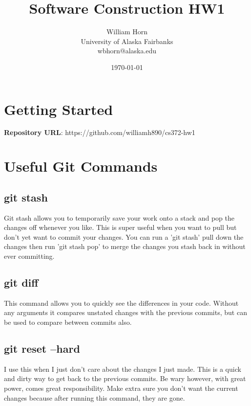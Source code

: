 \documentclass{article}
\begin{document}
\title{Software Construction HW1}
\author{William Horn\\University of Alaska Fairbanks\\wbhorn@alaska.edu}
\date{\today}
\maketitle
\section{Getting Started}
\textbf{Repository URL}: https://github.com/williamh890/cs372-hw1 \\
\section{Useful Git Commands}
\subsection{git stash}
Git stash allows you to temporarily save your work onto a stack and pop the changes off whenever you like.
This is super useful when you want to pull but don't yet want to commit your changes. You can run a 'git stash' pull
down the changes then run 'git stash pop' to merge the changes you stash back in without ever committing.
\subsection{git diff}
This command allows you to quickly see the differences in your code. Without any arguments it compares unstated changes
with the previous commits, but can be used to compare between commits also.
\subsection{git reset --hard}
I use this when I just don't care about the changes I just made. This is a quick and dirty way to
get back to the previous commits. Be wary however, with great power, comes great responsibility.
Make extra sure you don't want the current changes because after running this command, they are gone.
\end{document}
